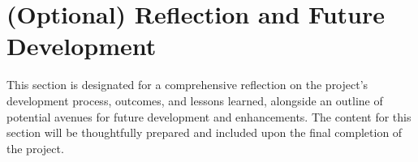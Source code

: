 \section{(Optional) Reflection and Future Development}
\label{section:reflection} %
This section is designated for a comprehensive reflection on the project's development process, outcomes, and lessons learned, alongside an outline of potential avenues for future development and enhancements. The content for this section will be thoughtfully prepared and included upon the final completion of the project.